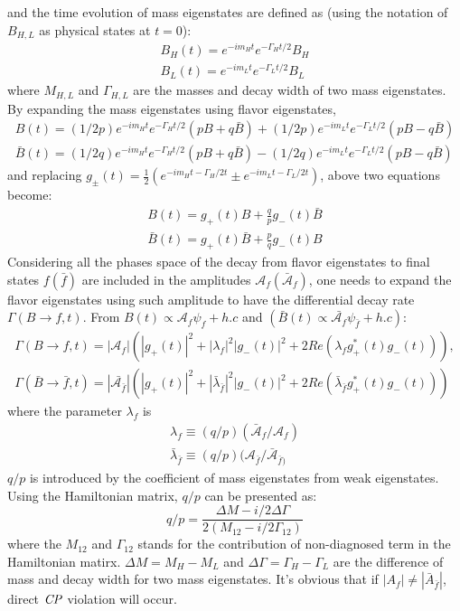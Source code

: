 and the time evolution of mass eigenstates are defined as (using the notation of $B_{H,L}$ as physical states at $t = 0$): 
\begin{eqnarray}
B_H(t)=e^{-im_Ht}e^{-\Gamma_Ht/2}B_H\\
B_L(t)=e^{-im_Lt}e^{-\Gamma_Lt/2}B_L
\end{eqnarray}
where $M_{H,L}$ and $\Gamma_{H,L}$ are the masses and decay width of two mass eigenstates. By expanding the mass eigenstates using flavor eigenstates, 
\begin{eqnarray}
B(t)=(1/2p)e^{-im_Ht}e^{-\Gamma_Ht/2}(pB+q\bar{B})+(1/2p)e^{-im_Lt}e^{-\Gamma_Lt/2}(pB-q\bar{B})\\
\bar{B}(t)=(1/2q)e^{-im_Ht}e^{-\Gamma_Ht/2}(pB+q\bar{B})-(1/2q)e^{-im_Lt}e^{-\Gamma_Lt/2}(pB-q\bar{B})
\end{eqnarray}
and replacing $g_{\pm}(t)=\frac{1}{2}(e^{-im_Ht-\Gamma_H/2t}\pm e^{-im_Lt-\Gamma_L/2t})$, above two equations become:
\begin{eqnarray}
B(t)=g_{+}(t)B +\frac{q}{p}g_{-}(t)\bar{B}\\
\bar{B}(t)=g_{+}(t)\bar{B} + \frac{p}{q}g_{-}(t){B}
\end{eqnarray}
Considering all the phases space of the decay from flavor eigenstates to final states $f(\bar{f})$ are included in the amplitudes $\mathcal{A}_f (\bar{\mathcal{A}}_f)$, one needs to expand the flavor eigenstates using such amplitude to have the differential decay rate $\Gamma(B\to f,t)$. From $B(t) \propto \mathcal{A}_f\psi_f+h.c $ and $ (\bar{B}(t) \propto \bar{\mathcal{A}_f}\psi_{\bar{f}}+h.c)$:
\begin{eqnarray}
\Gamma(B\to f,t)=|\mathcal{A}_f|(|g_+(t)|^2+|\lambda_f|^2|g_-(t)|^2+2Re(\lambda_f g^*_+(t)g_-(t))),\\
\Gamma(\bar{B}\to \bar{f},t)=|\bar{\mathcal{A}_{\bar{f}}}|(|g_+(t)|^2+|\bar{\lambda}_{\bar{f}}|^2|g_-(t)|^2+2Re(\bar{\lambda}_{\bar{f}} g^*_+(t)g_-(t)))
\end{eqnarray} where the parameter $\lambda_f$ is
\begin{eqnarray}
\lambda_f \equiv (q/p) (\bar{\mathcal{A}}_f / \mathcal{A}_f)\\
\bar{\lambda}_{\bar{f}} \equiv (q/p) ( \mathcal{A}_{\bar{f}}/\bar{\mathcal{A}}_{\bar{f})}
\end{eqnarray} 
$q/p$ is introduced by the coefficient of mass eigenstates from weak eigenstates. Using the Hamiltonian matrix, $q/p$ can be presented as: 
\begin{equation}
	q/p = \frac{\Delta M - i/2 \Delta \Gamma}{2(M_{12}- i/2 \Gamma_{12})}
\end{equation}
where the $M_{12}$ and $\Gamma_{12}$ stands for the contribution of non-diagnosed term in the Hamiltonian matirx. $\Delta{M}=M_H-M_L$ and $\Delta{\Gamma}=\Gamma_H-\Gamma_L$ are the difference of mass and decay width for two mass eigenstates.
It's obvious that if $|A_f| \neq |\bar{A}_{\bar{f}}|$, direct $\it{CP}$ violation will occur.  

